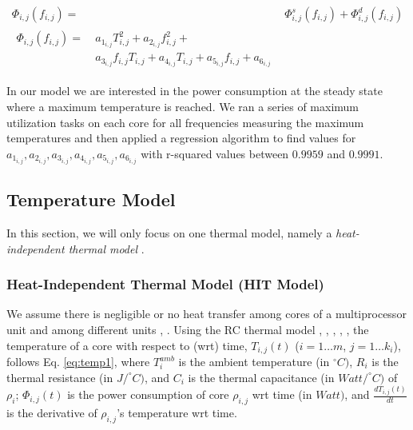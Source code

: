 \documentclass[conference]{IEEEtran}
\begin{document}
\begin{subequations}\label{eq:power}
	\begin{align}
		\Phi_{i,j}(f_{i,j}) =\ &\Phi^{s}_{i,j}(f_{i,j}) + \Phi^{d}_{i,j}(f_{i,j}) \label{eq:gpower} \\
		\begin{split}
			\Phi_{i,j}(f_{i,j}) =\ &a_{1_{i,j}}T^{2}_{i,j} + a_{2_{i,j}}f^{2}_{i,j} + \\
			&a_{3_{i,j}}f_{i,j}T_{i,j} + a_{4_{i,j}}T_{i,j} + a_{5_{i,j}}f_{i,j} + a_{6_{i,j}} \label{eq:tpower}
		\end{split}
	\end{align}
\end{subequations}

In our model we are interested in the power consumption at the steady state where a maximum temperature is reached. We ran a series of maximum utilization tasks on each core for all frequencies measuring the maximum temperatures and then applied a regression algorithm to find values for $a_{1_{i,j}}, a_{2_{i,j}}, a_{3_{i,j}}, a_{4_{i,j}}, a_{5_{i,j}}, a_{6_{i,j}}$ with r-squared values between $0.9959$ and $0.9991$.

\subsection{Temperature Model}

In this section, we will only focus on one thermal model, %
namely a \emph{heat-independent thermal model} \cite{Quan10}.

\subsubsection{Heat-Independent Thermal Model (HIT Model)}

We assume there is negligible or no heat transfer among cores of a multiprocessor unit and among different units \cite{Quan10}, \cite{Chaturvedi10}. 
Using the RC thermal model 
\cite{Chen09}, \cite{Chantem10}, \cite{Quan10},  \cite{Fisher09}, \cite{Chaturvedi10}, %
the temperature of a core %
with respect to (wrt) time, %
$T_{i,j}(t)$ ($i=1\ldots m$, $j=1\ldots k_i$), %
follows
Eq. \ref{eq:temp1}, where $T_i^{amb}$ is the ambient temperature (in $^\circ C)$, 
$R_i$ is the thermal resistance (in $J/ ^\circ C)$, and $C_i$ is the thermal capacitance (in $Watt/ ^\circ C)$ of $\rho_i$; $\Phi_{i,j}(t)$ is the power consumption of core $\rho_{i,j}$  wrt time (in $Watt)$,
and $\frac{dT_{i,j}(t)}{dt}$ is the derivative of $\rho_{i,j}$'s temperature wrt time. 
\end{document}
